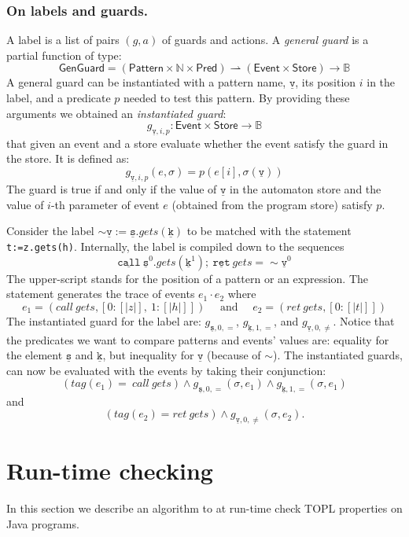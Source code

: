 \documentclass{llncs} %
\newcommand{\B}{\ensuremath{\mathbb{B}}}
\newcommand{\N}{\ensuremath{\mathbb{N}}}
\newcommand{\pattern}[1]{\ensuremath{\mathtt{\underline{#1}}}}
\newcommand{\pmap}{\rightharpoonup}
\newcommand{\set}[1]{\ensuremath{\mathsf{#1}}}
\begin{document}
\subsubsection{On labels and guards.}
 A label is a list of pairs $(g,a)$ of guards and actions. A  {\em general guard} is a partial function of type:
\[
\set{GenGuard} = (\set{Pattern} \times \N \times \set{Pred}) \pmap (\set{Event}\times\set{Store}) \to \B
\]
A general guard can be instantiated with a pattern  name, $\pattern v$,  its position $i$ in the label, and a predicate $p$ needed to test this pattern. By providing these arguments we obtained an {\em instantiated guard}:
\[
g_{\pattern{v},i,p} : \set{Event}\times\set{Store} \to \B
\]
that given an event and a store evaluate whether the event satisfy the guard in the store. It is defined as:
\newcommand{\sem}[1]{[ \! | #1 | \! ]}
\[
g_{\pattern{v},i,p}(e, \sigma) = p(e[i],\sigma(\pattern v))
\] The guard is true if and only if the value of $\pattern{v}$ in the automaton store 
and the value of $i$-th parameter of  event $e$ (obtained from the program store) satisfy $p$.
\begin{example}
Consider the label 
 $\sim \pattern {v} := \pattern {s}.gets(\pattern {k})$ to be matched with the statement 
 {\tt t:=z.gets(h)}. Internally,  the label is compiled down to the sequences 
\[
\pattern{call} \  \pattern{s}^0 .gets(\pattern {k}^1);  \ \pattern{ret} \ gets = \sim \pattern {v}^0   
\] The upper-script stands for the position of a pattern or an expression. The statement generates the trace of events $e_1 \cdot e_2$ where 
\[ 
 e_1=(call \ gets, [0: \sem{z}, \ 1: \sem{h}])  \quad \mbox{ and }  \quad e_2= (ret \ gets, [0: \sem{t}])
\] 
The instantiated guard for the label are:
 $g_{\pattern{s},0,=}$, $g_{\pattern{k},1,=}$, and  $g_{\pattern{v},0, \neq}$.  
Notice that the predicates we want to compare patterns and events' values are: equality for the element $\pattern{s}$ and $\pattern{k}$, 
but inequality for \pattern{v} (because of $\sim$).
The instantiated guards, can now be evaluated with the events by taking their conjunction:
\[ 
 (tag(e_1)= \ call \ gets) \wedge g_{\pattern{s},0,=}(\sigma,e_1) \wedge g_{\pattern{k},1,=}(\sigma, e_1) 
\] and 
\[ 
 (tag(e_2)= ret \ gets) \wedge g_{\pattern{v},0,\neq}(\sigma,e_2).
\]
\end{example}



\section{Run-time checking}
In this section we describe an algorithm to at run-time check TOPL properties on Java programs.
\end{document}
